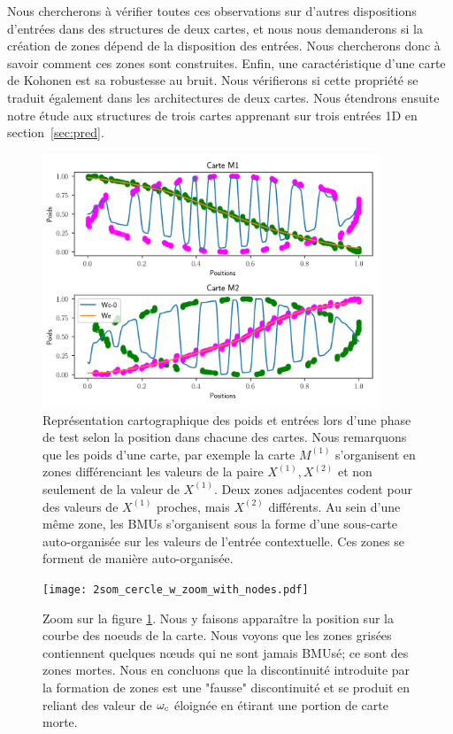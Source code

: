 \documentclass[../main]{subfiles}
\begin{document}
Nous chercherons à vérifier toutes ces observations sur d'autres dispositions d'entrées dans des structures de deux cartes, et nous nous demanderons si la création de zones dépend de la disposition des entrées. Nous chercherons donc à savoir comment ces zones sont construites. Enfin, une caractéristique d'une carte de Kohonen est sa robustesse au bruit. Nous vérifierons si cette propriété se traduit également dans les architectures de deux cartes.
Nous étendrons ensuite notre étude aux structures de trois cartes apprenant sur trois entrées 1D en section~\ref{sec:pred}.

\begin{figure}
	\centering\includegraphics[width=0.9\textwidth]{2som_cercle_w.pdf}
	\caption{Représentation cartographique des poids et entrées lors d'une phase de test selon la position dans chacune des cartes. Nous remarquons que les poids d'une carte, par exemple la carte $M^{(1)}$ s'organisent en zones différenciant les valeurs de la paire $X^{(1)}, X^{(2)}$ et non seulement de la valeur de $X^{(1)}$. Deux zones adjacentes codent pour des valeurs de $X^{(1)}$ proches, mais $X^{(2)}$ différents. Au sein d'une même zone, les BMUs s'organisent sous la forme d'une sous-carte auto-organisée sur les valeurs de l'entrée contextuelle. Ces zones se forment de manière auto-organisée. \label{fig:w}}
\end{figure}

\begin{figure}
	\texttt{[image: 2som\_cercle\_w\_zoom\_with\_nodes.pdf]}
	\caption{Zoom sur la figure \ref{fig:w}. Nous y faisons apparaître la position sur la courbe des noeuds de la carte. Nous voyons que les zones grisées contiennent quelques n\oe{}uds qui ne sont jamais BMUsé; ce sont des zones mortes. Nous en concluons que la discontinuité introduite par la formation de zones est une "fausse" discontinuité et se produit en reliant des valeur de $\omega_c$ éloignée en étirant une portion de carte morte. \label{fig:w_zoom}}
\end{figure}
\end{document}
